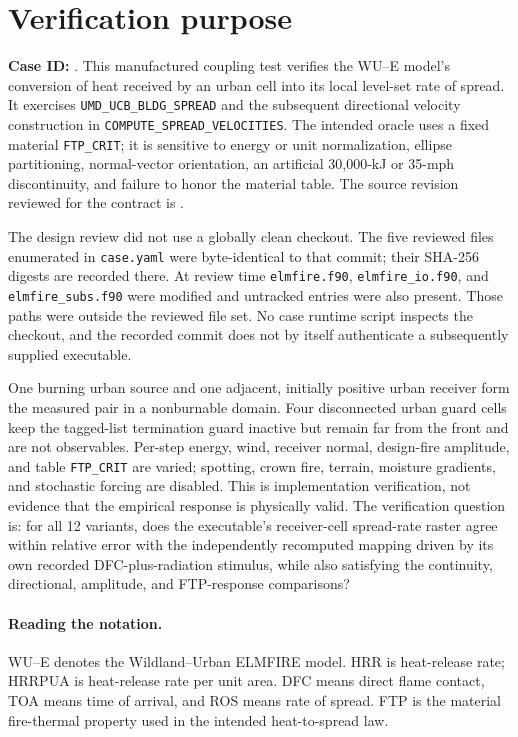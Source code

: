 \section{Verification purpose}

\textbf{Case ID:} \texttt{\CaseID}.  This manufactured coupling test verifies the
WU--E model's conversion of heat received by an urban cell into its local
level-set rate of spread.  It exercises \texttt{UMD\_UCB\_BLDG\_SPREAD} and the
subsequent directional velocity construction in
\texttt{COMPUTE\_SPREAD\_VELOCITIES}. The intended oracle uses a fixed
material \texttt{FTP\_CRIT}; it is sensitive to energy or unit normalization,
ellipse partitioning, normal-vector orientation, an artificial 30,000-kJ or
35-mph discontinuity, and failure to honor the material table. The source
revision reviewed for the contract is
\SourceCommit.

The design review did not use a globally clean checkout.  The five reviewed
files enumerated in \texttt{case.yaml} were byte-identical to that commit;
their SHA-256 digests are recorded there.  At review time
\texttt{elmfire.f90}, \texttt{elmfire\_io.f90}, and
\texttt{elmfire\_subs.f90} were modified and untracked entries were also
present.  Those paths were outside the reviewed file set.  No case runtime
script inspects the checkout, and the recorded commit does not by itself
authenticate a subsequently supplied executable.

One burning urban source and one adjacent, initially positive urban receiver
form the measured pair in a nonburnable domain.  Four disconnected urban guard
cells keep the tagged-list termination guard inactive but remain far from the
front and are not observables.  Per-step energy, wind, receiver normal,
design-fire amplitude, and table \texttt{FTP\_CRIT} are varied; spotting,
crown fire, terrain, moisture gradients, and stochastic forcing are disabled.
This is implementation verification, not evidence that the empirical response
is physically valid.  The verification question is: for all 12 variants, does
the executable's receiver-cell spread-rate raster agree within
\ROSTolerance{} relative error with the independently recomputed mapping driven
by its own recorded DFC-plus-radiation stimulus, while also satisfying the
continuity, directional, amplitude, and FTP-response comparisons?


\paragraph{Reading the notation.}
WU--E denotes the Wildland--Urban ELMFIRE model. HRR is heat-release rate;
HRRPUA is heat-release rate per unit area. DFC means direct flame contact,
TOA means time of arrival, and ROS means rate of spread. FTP is the material
fire-thermal property used in the intended heat-to-spread law.

